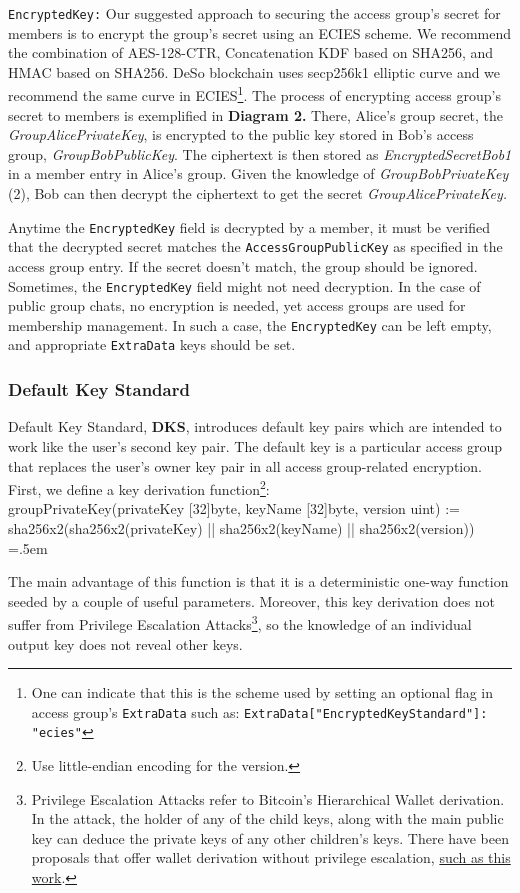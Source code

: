 \documentclass[oneside, 12pt]{article}
\newenvironment{lcverbatim}
 {\SaveVerbatim{cverb}}
 {\endSaveVerbatim
  \flushleft\fboxrule=0pt\fboxsep=.5em
  \colorbox{cverbbg}{%
    \makebox[\dimexpr\linewidth-2\fboxsep][l]{\BUseVerbatim{cverb}}%
  }
  \endflushleft
}
\newcommand{\ctexttt}[1]{\colorbox{cverbbg}{\texttt{#1}}}
\newcommand{\fn}[1]{\footnote{\hangpara{1.4em}{1} #1}}
\begin{document}
\ctexttt{EncryptedKey:} Our suggested approach to securing the access group’s secret for members is to encrypt the group’s secret using an ECIES scheme. We recommend the combination of AES-128-CTR, Concatenation KDF based on SHA256, and HMAC based on SHA256. DeSo blockchain uses secp256k1 elliptic curve and we recommend the same curve in ECIES\fn{One can indicate that this is the scheme used by setting an optional flag in access group’s \texttt{ExtraData} such as: \texttt{ExtraData["EncryptedKeyStandard"]: "ecies"}}. The process of encrypting access group’s secret to members is exemplified in \textbf{Diagram 2.} There, Alice’s group secret, the \textit{GroupAlicePrivateKey}, is encrypted to the public key stored in Bob’s access group, \textit{GroupBobPublicKey}. The ciphertext is then stored as \textit{EncryptedSecretBob1} in a member entry in Alice’s group. Given the knowledge of \textit{GroupBobPrivateKey} (2), Bob can then decrypt the ciphertext to get the secret \textit{GroupAlicePrivateKey.}

Anytime the \texttt{EncryptedKey} field is decrypted by a member, it must be verified that the decrypted secret matches the \texttt{AccessGroupPublicKey} as specified in the access group entry. If the secret doesn’t match, the group should be ignored. Sometimes, the \texttt{EncryptedKey} field might not need decryption. In the case of public group chats, no encryption is needed, yet access groups are used for membership management. In such a case, the \texttt{EncryptedKey} can be left empty, and appropriate \texttt{ExtraData} keys should be set.

\subsubsection{Default Key Standard}
Default Key Standard, \textbf{DKS}, introduces default key pairs which are intended to work like the user's second key pair. The default key is a particular access group that replaces the user’s owner key pair in all access group-related encryption. First, we define a key derivation function\fn{Use little-endian encoding for the version.}:\\

\small{
\begin{lcverbatim}
groupPrivateKey(privateKey [32]byte, keyName [32]byte, version uint) :=
   sha256x2(sha256x2(privateKey) || sha256x2(keyName) || sha256x2(version))
\end{lcverbatim}
}

\noindent The main advantage of this function is that it is a deterministic one-way function seeded by a couple of useful parameters. Moreover, this key derivation does not suffer from Privilege Escalation Attacks\fn{Privilege Escalation Attacks refer to Bitcoin’s Hierarchical Wallet derivation. In the attack, the holder of any of the child keys, along with the main public key can deduce the private keys of any other children’s keys. There have been proposals that offer wallet derivation without privilege escalation, \href{https://ieeexplore.ieee.org/document/8625151}{such as this work}.}, so the knowledge of an individual output key does not reveal other keys.\\
\end{document}
